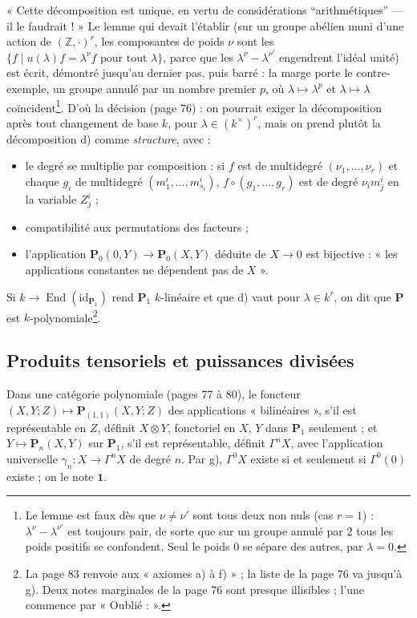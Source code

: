 \documentclass[11pt,a4paper]{article}
\begin{document}
« Cette décomposition est unique, en vertu de considérations
“arithmétiques” — il le faudrait ! » Le lemme qui devait l'établir (sur un
groupe abélien muni d'une action de $(\mathbb{Z}, \cdot)^{r}$, les
composantes de poids $\nu$ sont les $\{f \mid u(\lambda)f = \lambda^{\nu} f \text{ pour tout } \lambda\}$, parce que les $\lambda^{\nu} - \lambda^{\nu'}$ engendrent
l'idéal unité) est écrit, démontré jusqu'au dernier pas, puis barré : la
marge porte le contre-exemple, un groupe annulé par un nombre premier $p$, où
$\lambda \mapsto \lambda^{p}$ et $\lambda \mapsto \lambda$
coïncident\footnote{Le lemme est faux dès que $\nu \neq \nu'$ sont tous deux
non nuls (cas $r = 1$) : $\lambda^{\nu} - \lambda^{\nu'}$ est toujours pair,
de sorte que sur un groupe annulé par $2$ tous les poids positifs se
confondent. Seul le poids $0$ se sépare des autres, par $\lambda = 0$.}.
D'où la décision (page 76) : on pourrait exiger la décomposition après tout
changement de base $k$, pour $\lambda \in (k^{\times})^{r}$, mais on prend
plutôt la décomposition d) comme \emph{structure}, avec :
\begin{itemize}
\item[e)] le degré se multiplie par composition : si $f$ est de multidegré
$(\nu_{1}, \ldots, \nu_{r})$ et chaque $g_{i}$ de multidegré
$(m^{i}_{1}, \ldots, m^{i}_{s_{i}})$, $f \circ (g_{1}, \ldots, g_{r})$ est de
degré $\nu_{i} m^{i}_{j}$ en la variable $Z^{i}_{j}$ ;
\item[f)] compatibilité aux permutations des facteurs ;
\item[g)] l'application $\mathbf{P}_{0}(0, Y) \to \mathbf{P}_{0}(X, Y)$
déduite de $X \to 0$ est bijective : « les applications constantes ne
dépendent pas de $X$ ».
\end{itemize}
Si $k \to \operatorname{End}(\mathrm{id}_{\mathbf{P}_{1}})$ rend
$\mathbf{P}_{1}$ $k$-linéaire et que d) vaut pour $\lambda \in k^{r}$, on dit
que $\mathbf{P}$ est $k$-polynomiale\footnote{La page 83 renvoie aux
« axiomes a) à f) » ; la liste de la page 76 va jusqu'à g). Deux notes
marginales de la page 76 sont presque illisibles ; l'une commence par
« Oublié : ».}.

\subsection*{Produits tensoriels et puissances divisées}

Dans une catégorie polynomiale (pages 77 à 80), le foncteur
$(X, Y; Z) \mapsto \mathbf{P}_{(1,1)}(X, Y; Z)$ des applications
« bilinéaires », s'il est représentable en $Z$, définit $X \otimes Y$,
fonctoriel en $X$, $Y$ dans $\mathbf{P}_{1}$ seulement ; et $Y \mapsto
\mathbf{P}_{n}(X, Y)$ sur $\mathbf{P}_{1}$, s'il est représentable, définit
$\Gamma^{n}X$, avec l'application universelle $\gamma_{n} : X \to \Gamma^{n}X$
de degré $n$. Par g), $\Gamma^{0}X$ existe si et seulement si
$\Gamma^{0}(0)$ existe ; on le note $\mathbf{1}$.
\end{document}
